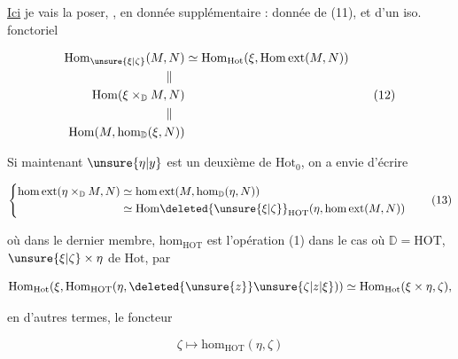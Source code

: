 \uline{Ici} je vais la poser,  , en donnée  supplémentaire : donnée de (11), et d'un iso. fonctoriel

\[
\begin{aligned}
\mathrm{Hom}_{\unsure{\xi|\zeta}}(M,N)&\simeq\mathrm{Hom}_{\mathrm{Hot}}(\xi,\mathrm{Hom\,ext}(M,N))\\
\mathrel{\Vert}\hspace{1em}&\\
\mathrm{Hom}(\xi\times_{\mathbb D}M,N)&\\
\mathrel{\Vert}\hspace{1em}&\\
\mathrm{Hom}(M,\mathrm{hom}_{\mathbb D}(\xi,N))&
\end{aligned}\tag*{(12)}
\]


Si maintenant $\unsure{\eta|y}$ est un deuxième  de $\mathrm{Hot}_0$, on a envie d'écrire

\[
\left\{\begin{aligned}
\mathrm{hom\,ext}(\eta\times_{\mathbb D}M,N)&\simeq\mathrm{hom\,ext}(M,\mathrm{hom}_{\mathbb D}(\eta,N))\\
&\simeq\mathrm{Hom}\deleted{\unsure{\xi|\zeta}}_{\mathrm{HOT}}(\eta,\mathrm{hom\,ext}(M,N))
\end{aligned}\right.\tag*{(13)}
\]

où dans le dernier membre, $\mathrm{hom}_{\mathrm{HOT}}$ est l'opération (1) dans le cas où $\mathbb D=\mathrm{HOT}$,  $\unsure{\xi|\zeta}\times\eta$ de $\mathrm{Hot}$, par

\[\mathrm{Hom}_{\mathrm{Hot}}(\xi,\mathrm{Hom}_{\mathrm{HOT}}(\eta,\deleted{\unsure{z}}\unsure{\zeta|z|\xi}))\simeq\mathrm{Hom}_{\mathrm{Hot}}(\xi\times\eta,\zeta),\]

en d'autres termes,  le foncteur

\[\zeta\longmapsto\mathrm{hom}_{\mathrm{HOT}}(\eta,\zeta)\]

